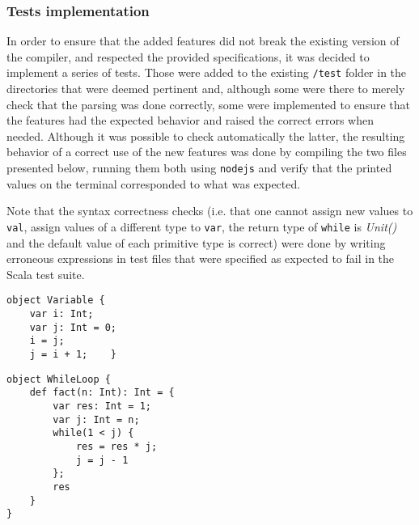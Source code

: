 \subsubsection{Tests implementation}

In order to ensure that the added features did not break the existing version of the compiler, and respected the provided specifications, it was decided to implement a series of tests. Those were added to the existing \texttt{/test} folder in the directories that were deemed pertinent and, although some were there to merely check that the parsing was done correctly, some were implemented to ensure that the features had the expected behavior and raised the correct errors when needed. Although it was possible to check automatically the latter, the resulting behavior of a correct use of the new features was done by compiling the two files presented below, running them both using \texttt{nodejs} and verify that the printed values on the terminal corresponded to what was expected.

Note that the syntax correctness checks (i.e. that one cannot assign new values to \texttt{val}, assign values of a different type to \texttt{var}, the return type of \texttt{while} is \textit{Unit()} and the default value of each primitive type is correct) were done by writing erroneous expressions in test files  that were specified as expected to fail in the Scala test suite.
\begin{lstlisting}
object Variable {
	var i: Int;
	var j: Int = 0;
	i = j;
	j = i + 1;    }
\end{lstlisting}
\begin{lstlisting}
object WhileLoop {
	def fact(n: Int): Int = {
		var res: Int = 1;
		var j: Int = n;
		while(1 < j) {
			res = res * j;
			j = j - 1
		};
		res
	}
}
\end{lstlisting}
 